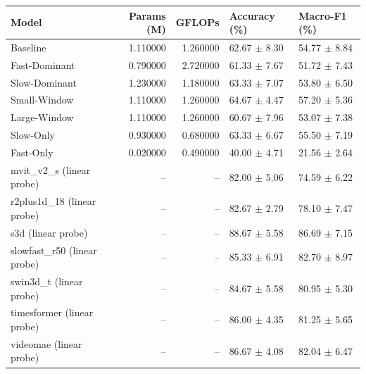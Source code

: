 \begin{tabular}{lrrll}
\toprule
Model & Params (M) & GFLOPs & Accuracy (\%) & Macro-F1 (\%) \\
\midrule
Baseline & 1.110000 & 1.260000 & 62.67 $\pm$ 8.30 & 54.77 $\pm$ 8.84 \\
Fast-Dominant & 0.790000 & 2.720000 & 61.33 $\pm$ 7.67 & 51.72 $\pm$ 7.43 \\
Slow-Dominant & 1.230000 & 1.180000 & 63.33 $\pm$ 7.07 & 53.80 $\pm$ 6.50 \\
Small-Window & 1.110000 & 1.260000 & 64.67 $\pm$ 4.47 & 57.20 $\pm$ 5.36 \\
Large-Window & 1.110000 & 1.260000 & 60.67 $\pm$ 7.96 & 53.07 $\pm$ 7.38 \\
Slow-Only & 0.930000 & 0.680000 & 63.33 $\pm$ 6.67 & 55.50 $\pm$ 7.19 \\
Fast-Only & 0.020000 & 0.490000 & 40.00 $\pm$ 4.71 & 21.56 $\pm$ 2.64 \\
mvit_v2_s (linear probe) & -- & -- & 82.00 $\pm$ 5.06 & 74.59 $\pm$ 6.22 \\
r2plus1d_18 (linear probe) & -- & -- & 82.67 $\pm$ 2.79 & 78.10 $\pm$ 7.47 \\
s3d (linear probe) & -- & -- & 88.67 $\pm$ 5.58 & 86.69 $\pm$ 7.15 \\
slowfast_r50 (linear probe) & -- & -- & 85.33 $\pm$ 6.91 & 82.70 $\pm$ 8.97 \\
swin3d_t (linear probe) & -- & -- & 84.67 $\pm$ 5.58 & 80.95 $\pm$ 5.30 \\
timesformer (linear probe) & -- & -- & 86.00 $\pm$ 4.35 & 81.25 $\pm$ 5.65 \\
videomae (linear probe) & -- & -- & 86.67 $\pm$ 4.08 & 82.04 $\pm$ 6.47 \\
\bottomrule
\end{tabular}
